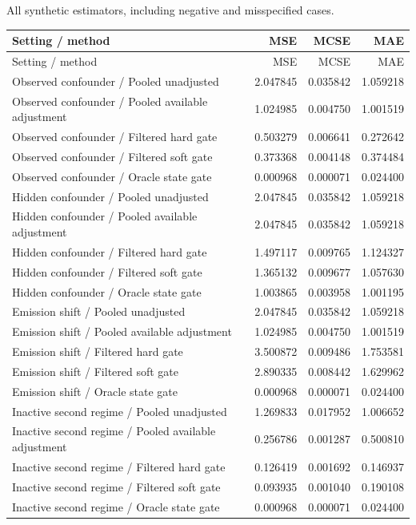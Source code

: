 All synthetic estimators, including negative and misspecified cases.
\begingroup\footnotesize\setlength{\tabcolsep}{4pt}
\begin{longtable}{p{.63\linewidth}rrr}\toprule
Setting / method & MSE & MCSE & MAE\\\midrule\endfirsthead
\toprule Setting / method & MSE & MCSE & MAE\\\midrule\endhead
\bottomrule\endfoot
Observed confounder / Pooled unadjusted & 2.047845 & 0.035842 & 1.059218\\
Observed confounder / Pooled available adjustment & 1.024985 & 0.004750 & 1.001519\\
Observed confounder / Filtered hard gate & 0.503279 & 0.006641 & 0.272642\\
Observed confounder / Filtered soft gate & 0.373368 & 0.004148 & 0.374484\\
Observed confounder / Oracle state gate & 0.000968 & 0.000071 & 0.024400\\
Hidden confounder / Pooled unadjusted & 2.047845 & 0.035842 & 1.059218\\
Hidden confounder / Pooled available adjustment & 2.047845 & 0.035842 & 1.059218\\
Hidden confounder / Filtered hard gate & 1.497117 & 0.009765 & 1.124327\\
Hidden confounder / Filtered soft gate & 1.365132 & 0.009677 & 1.057630\\
Hidden confounder / Oracle state gate & 1.003865 & 0.003958 & 1.001195\\
Emission shift / Pooled unadjusted & 2.047845 & 0.035842 & 1.059218\\
Emission shift / Pooled available adjustment & 1.024985 & 0.004750 & 1.001519\\
Emission shift / Filtered hard gate & 3.500872 & 0.009486 & 1.753581\\
Emission shift / Filtered soft gate & 2.890335 & 0.008442 & 1.629962\\
Emission shift / Oracle state gate & 0.000968 & 0.000071 & 0.024400\\
Inactive second regime / Pooled unadjusted & 1.269833 & 0.017952 & 1.006652\\
Inactive second regime / Pooled available adjustment & 0.256786 & 0.001287 & 0.500810\\
Inactive second regime / Filtered hard gate & 0.126419 & 0.001692 & 0.146937\\
Inactive second regime / Filtered soft gate & 0.093935 & 0.001040 & 0.190108\\
Inactive second regime / Oracle state gate & 0.000968 & 0.000071 & 0.024400\\
\end{longtable}\endgroup